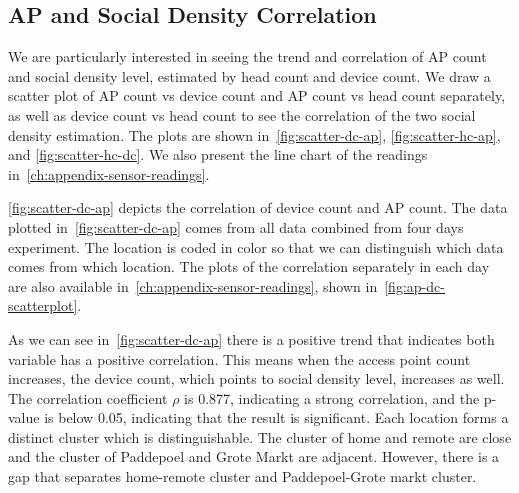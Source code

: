 	\subsection{AP and Social Density Correlation} %
	\label{sub:ap_and_social_density_correlation}
	We are particularly interested in seeing the trend and correlation of \ac{AP} count and social density level, estimated by head count and device count. We draw a scatter plot of \ac{AP} count vs device count and \ac{AP} count vs head count separately, as well as device count vs head count to see the correlation of the two social density estimation. The plots are shown in~\autoref{fig:scatter-dc-ap}, \autoref{fig:scatter-hc-ap}, and \autoref{fig:scatter-hc-dc}. We also present the line chart of the readings in~\autoref{ch:appendix-sensor-readings}.

	\autoref{fig:scatter-dc-ap} depicts the correlation of device count and \ac{AP} count. The data plotted in~\autoref{fig:scatter-dc-ap} comes from all data combined from four days experiment. The location is coded in color so that we can distinguish which data comes from which location. The plots of the correlation separately in each day are also available in~\autoref{ch:appendix-sensor-readings}, shown in~\autoref{fig:ap-dc-scatterplot}.
	
	As we can see in~\autoref{fig:scatter-dc-ap} there is a positive trend that indicates both variable has a positive correlation. This means when the access point count increases, the device count, which points to social density level, increases as well. The correlation coefficient $\rho$ is 0.877, indicating a strong correlation, and the p-value is below 0.05, indicating that the result is significant. Each location forms a distinct cluster which is distinguishable. The cluster of home and remote are close and the cluster of Paddepoel and Grote Markt are adjacent. However, there is a gap that separates home-remote cluster and Paddepoel-Grote markt cluster.

